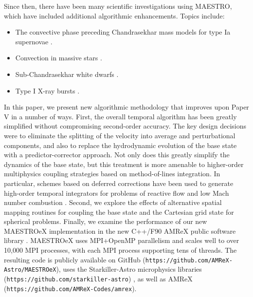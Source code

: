 Since then, there have been many scientific investigations using MAESTRO, which have included additional algorithmic enhancements.  Topics include:
\begin{itemize}
\item The convective phase preceding Chandrasekhar mass models for type Ia supernovae \citep{MAESTRO_convection,MAESTRO_AMR,MAESTRO_CASTRO}.
\item Convection in massive stars \citep{Gilet:2013,gilkis:2016}.
\item Sub-Chandrasekhar white dwarfs \citep{subChandra_I,subChandra_II}.
\item Type I X-ray bursts \citep{XRB_I,XRB_II,XRB_III}.
\end{itemize}

In this paper, we present new algorithmic methodology that improves upon Paper V in a number of ways.
First, the overall temporal algorithm has been greatly simplified without compromising second-order accuracy.
The key design decisions were to eliminate the splitting of the velocity into average and perturbational components,
and also to replace the hydrodynamic evolution of the base state with a predictor-corrector approach.
Not only does this greatly simplify the dynamics of the base
state, but this treatment is more amenable to higher-order multiphysics coupling strategies
based on method-of-lines integration.
In particular, schemes based on deferred corrections have been used to generate high-order temporal integrators for problems of reactive flow \citep{dutt2000spectral} and low Mach number combustion \citep{pazner2016high,nonaka2018conservative}.
Second, we explore the effects of alternative spatial mapping routines for coupling the base state and the Cartesian grid state for spherical problems.
Finally, we examine the performance of our new MAESTROeX implementation in the new C++/F90 AMReX public software library \citep{AMReX,AMReX_JOSS}.
MAESTROeX uses MPI+OpenMP parallelism and scales well to over 10,000 MPI processes, with each MPI process supporting tens of threads.
The resulting code is publicly available on GitHub ({\tt https://github.com/AMReX-Astro/MAESTROeX}),
uses the Starkiller-Astro microphysics libraries \citep{starkiller} ({\tt https://github.com/starkiller-astro}) ,
as well as AMReX ({\tt https://github.com/AMReX-Codes/amrex}).


